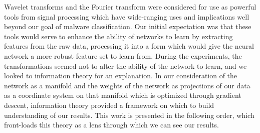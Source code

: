 Wavelet transforms and the Fourier transform were considered for use as powerful tools from signal processing which have wide-ranging uses and implications well beyond our goal of malware classification.
Our initial expectation was that these tools would serve to enhance the ability of networks to learn by extracting features from the raw data, processing it into a form which would give the neural network a more robust feature set to learn from.
During the experiments, the transformations seemed not to alter the ability of the network to learn, and we looked to information theory for an explanation. 
In our consideration of the network as a manifold and the weights of the network as projections of our data as a coordinate system on that manifold which is optimized through gradient descent, information theory provided a framework on which to build understanding of our results. 
This work is presented in the following order, which front-loads this theory as a lens through which we can see our results.

